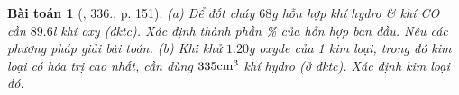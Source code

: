 \documentclass{article}
\newtheorem{baitoan}{Bài toán}
\begin{document}
\begin{baitoan}[\cite{An_400_BT_Hoa_Hoc_8_2020}, 336., p. 151]
	(a) Để đốt cháy $68$\emph{g} hỗn hợp khí hydro \& khí \emph{CO} cần $89.6$\emph{l} khí oxy (đktc). Xác định thành phần \% của hỗn hợp ban đầu. Nêu các phương pháp giải bài toán. (b) Khi khử $1.20$\emph{g} oxyde của 1 kim loại, trong đó kim loại có hóa trị cao nhất, cần dùng $\rm335cm^3$ khí hydro (ở đktc). Xác định kim loại đó.
\end{baitoan}


\printbibliography[heading=bibintoc]
	
\end{document}

